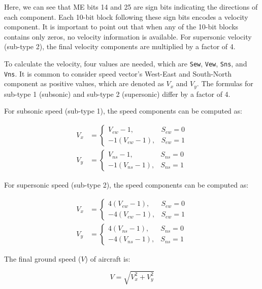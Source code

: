 Here, we can see that ME bits 14 and 25 are sign bits indicating the directions of each component. Each 10-bit block following these sign bits encodes a velocity component. It is important to point out that when any of the 10-bit blocks contains only zeros, no velocity information is available. For supersonic velocity (sub-type 2), the final velocity components are multiplied by a factor of 4.

To calculate the velocity, four values are needed, which are \texttt{Sew}, \texttt{Vew},  \texttt{Sns}, and \texttt{Vns}. It is common to consider speed vector's West-East and South-North component as positive values, which are denoted as $V_x$ and $V_y$. The formulas for sub-type 1 (subsonic) and sub-type 2 (supersonic) differ by a factor of 4.

For subsonic speed (sub-type 1), the speed components can be computed as:

\begin{align}
  V_x &= 
  \begin{cases}
    V_{ew} - 1, & S_{ew} = 0 \\
    -1(V_{ew} - 1), & S_{ew} = 1
  \end{cases}
 \\
  V_y &= 
  \begin{cases}
    V_{ns} - 1, & S_{ns} = 0 \\
    -1(V_{ns} - 1), & S_{ns} = 1
  \end{cases}
\end{align}

For supersonic speed (sub-type 2), the speed components can be computed as:

\begin{align}
  V_x &= 
  \begin{cases}
    4(V_{ew} - 1), & S_{ew} = 0 \\
    -4(V_{ew} - 1), & S_{ew} = 1
  \end{cases}
 \\
  V_y &= 
  \begin{cases}
    4(V_{ns} - 1), & S_{ns} = 0 \\
    -4(V_{ns} - 1), & S_{ns} = 1
  \end{cases}
\end{align}

The final ground speed ($V$) of aircraft is:

\begin{equation}
  V = \sqrt{V_x^2 + V_y^2}
\end{equation}

